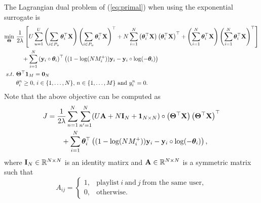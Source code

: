 The Lagrangian dual problem of (\ref{eq:primal}) when using the exponential surrogate is
\begin{equation}
\label{eq:dual}
\begin{aligned}
\min_{\mathbf{\Theta}} \ & \frac{1}{2 \lambda} \left[
     U \sum_{u=1}^U \left( \sum_{i \in P_u} \bm{\theta}_i^\top \mathbf{X} \right) \left( \sum_{i \in P_u} \bm{\theta}_i^\top \mathbf{X} \right)^\top
   + N \sum_{i=1}^N \left( \bm{\theta}_i^\top \mathbf{X} \right) \left( \bm{\theta}_i^\top \mathbf{X} \right)^\top
   + \left( \sum_{i=1}^N \bm{\theta}_i^\top \mathbf{X} \right) \left( \sum_{i=1}^N \bm{\theta}_i^\top \mathbf{X} \right)^\top \right] \\
& \hspace{1em}
   + \sum_{i=1}^N \left( \mathbf{y}_i \circ \bm{\theta}_i \right)^\top \left( (1 - \log(N M_i^+)) \mathbf{y}_i - \mathbf{y}_i \circ \log(-\bm{\theta}_i) \right) \\
s.t. \ & \mathbf{\Theta}^\top \mathbf{1}_M = \mathbf{0}_N \\
           & \theta_i^n \ge 0, \, i \in \{1,\dots,N\}, \, n \in \{1,\dots,M\} \ \mathrm{and} \ y_i^n = 0.
\end{aligned}
\end{equation}
Note that the above objective can be computed as
\begin{equation*}
\begin{aligned}
J &= \frac{1}{2 \lambda} \sum_{n=1}^N \sum_{n'=1}^N (U \mathbf{A} + N \mathbf{I}_N + \mathbf{1}_{N \times N}) 
     \circ \left( \mathbf{\Theta}^\top \mathbf{X} \right) \left( \mathbf{\Theta}^\top \mathbf{X} \right)^\top \\
& \hspace{2em}
     + \sum_{i=1}^N \bm{\theta}_i^\top \left( (1 - \log(N M_i^+)) \mathbf{y}_i - \mathbf{y}_i \circ \log(-\bm{\theta}_i) \right),
\end{aligned}
\end{equation*}
where $\mathbf{I}_N \in \mathbb{R}^{N \times N}$ is an identity matirx and $\mathbf{A} \in \mathbb{R}^{N \times N}$ is a symmetric matrix such that
\begin{equation*}
A_{ij} = 
\begin{cases}
1, & \text{playlist} \ i \ \text{and} \ j \ \text{from the same user}, \\
0, & \text{otherwise}.
\end{cases}
\end{equation*}

